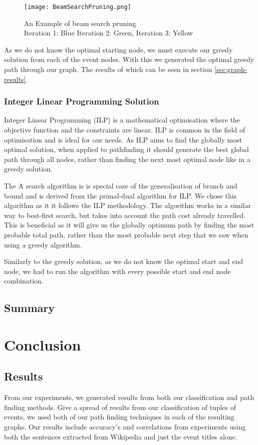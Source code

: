 \documentclass[bsc,frontabs,twoside,singlespacing,parskip,deptreport]{infthesis}     %
\begin{document}
\begin{figure}
  \texttt{[image: BeamSearchPruning.png]}
  \caption{An Example of beam search pruning\\ Iteration 1: Blue Iteration 2: Green, Iteration 3: Yellow}
  \label{fig:beam-prune}
\end{figure}

As we do not know the optimal starting node, we must execute our greedy solution from each of the event nodes.
With this we generated the optimal greedy path through our graph. The results of which can be seen in section \ref{sec:graph-results}.

\subsection{Integer Linear Programming Solution}
Integer Linear Programming (ILP) is a mathematical optimisation where the objective function and the constraints are linear.
ILP is common in the field of optimisation and is ideal for our needs. As ILP aims to find the globally most optimal solution, when applied to pathfinding it
should generate the best global path through all nodes, rather than finding the next most optimal node like in a greedy solution.


The A\* search algorithm is is special case of the generalisation of branch and bound\cite{balas1983branch} and is derived from the primal-dual algorithm for ILP\cite{ye2012note}.
We chose this algorithm as it it follows the ILP methodology. The algorithm works in a similar way to best-first search, but takes into account the path cost already travelled.
This is beneficial as it will give us the globally optimum path by finding the most probable total path, rather than the most probable next step that we saw when using a
greedy algorithm.

Similarly to the greedy solution, as we do not know the optimal start and end node, we had to run the algorithm with every possible start and end node combination.


\section{Summary}

\chapter{Conclusion}
\section{Results}
From our experiments, we generated results from both our classification and path finding methods.
Give a spread of results from our classification of tuples of events, we used both of our path finding
techniques in each of the resulting graphs. Our results include accuracy's and correlations from
experiments using both the sentences extracted from Wikipedia and just the event titles alone.   
\end{document}
